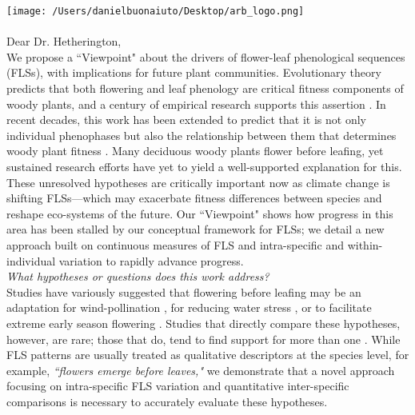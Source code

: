 \documentclass[10.5pt,a4paper]{article}
\begin{document}

\def\labelitemi{--}
\parindent=24pt
\texttt{[image: /Users/danielbuonaiuto/Desktop/arb\_logo.png]}
\\\\
{Dear Dr. Hetherington,}\\

\noindent We propose a ``Viewpoint" about the drivers of flower-leaf phenological sequences (FLSs), with implications for future plant communities. Evolutionary theory predicts that both flowering and leaf phenology are critical fitness components of woody plants, and a century of empirical research supports this assertion \citep{Munguia-Rosas2011,Forrest2010}. In recent decades, this work has been extended to predict that it is not only individual phenophases but also the relationship between them that determines woody plant fitness \citep{Menzel1999,Ettinger2018}. Many deciduous woody plants flower before leafing, yet sustained research efforts have yet to yield a well-supported explanation for this. These unresolved hypotheses are critically important now as climate change is shifting FLSs---which may exacerbate fitness differences between species and reshape eco-systems of the future. Our ``Viewpoint" shows how progress in this area has been stalled by our conceptual framework for FLSs; we detail a new approach built on continuous measures of FLS and intra-specific and within-individual variation to rapidly advance progress. %
\vspace{1.5ex}\\
\noindent \emph{What hypotheses or questions does this work address?}
\vspace{1.5ex}\\
\noindent Studies have variously suggested that flowering before leafing may be an adaptation for wind-pollination \citep{Rathcke_1985}, for reducing water stress \citep{Reich1984}, or to facilitate extreme early season flowering \citep{Primack1987}. Studies that directly compare these hypotheses, however, are rare; those that do, tend to find support for more than one \citep{Gougherty2018,Bolmgren2003}. While FLS patterns are usually treated as qualitative descriptors at the species level, for example, \textit{``flowers emerge before leaves,"} we demonstrate that a novel approach focusing on intra-specific FLS variation and quantitative inter-specific comparisons is necessary to accurately evaluate these hypotheses. \\
\end{document}
